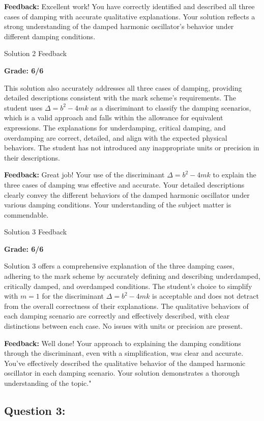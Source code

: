 \documentclass[a4paper,11pt]{article}
\begin{document}
\textbf{Feedback:} Excellent work! You have correctly identified and described all three cases of damping with accurate qualitative explanations. Your solution reflects a strong understanding of the damped harmonic oscillator's behavior under different damping conditions.

Solution 2 Feedback

\textbf{Grade: 6/6}

This solution also accurately addresses all three cases of damping, providing detailed descriptions consistent with the mark scheme's requirements. The student uses \(\Delta = b^2 - 4mk\) as a discriminant to classify the damping scenarios, which is a valid approach and falls within the allowance for equivalent expressions. The explanations for underdamping, critical damping, and overdamping are correct, detailed, and align with the expected physical behaviors. The student has not introduced any inappropriate units or precision in their descriptions.

\textbf{Feedback:} Great job! Your use of the discriminant \(\Delta = b^2 - 4mk\) to explain the three cases of damping was effective and accurate. Your detailed descriptions clearly convey the different behaviors of the damped harmonic oscillator under various damping conditions. Your understanding of the subject matter is commendable.

Solution 3 Feedback

\textbf{Grade: 6/6}

Solution 3 offers a comprehensive explanation of the three damping cases, adhering to the mark scheme by accurately defining and describing underdamped, critically damped, and overdamped conditions. The student's choice to simplify with \(m=1\) for the discriminant \(\Delta = b^2 - 4mk\) is acceptable and does not detract from the overall correctness of their explanations. The qualitative behaviors of each damping scenario are correctly and effectively described, with clear distinctions between each case. No issues with units or precision are present.

\textbf{Feedback:} Well done! Your approach to explaining the damping conditions through the discriminant, even with a simplification, was clear and accurate. You've effectively described the qualitative behavior of the damped harmonic oscillator in each damping scenario. Your solution demonstrates a thorough understanding of the topic."

\subsection*{Question 3:}
\end{document}
